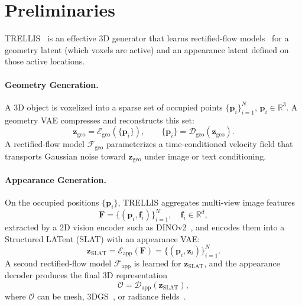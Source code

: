 
\section{Preliminaries}
\label{sec:prelim}

\label{sec:trellis}
TRELLIS~\cite{trellis} is an effective 3D generator that learns rectified-flow models~\cite{lipman2022flow,esser2024scaling} for a geometry latent (which voxels are active) and an appearance latent defined on those active locations.

\paragraph{Geometry Generation.}
A 3D object is voxelized into a sparse set of occupied points $\{\mathbf{p}_i\}_{i=1}^N$, $\mathbf{p}_i \in \mathbb{R}^3$. A geometry VAE compresses and reconstructs this set:
\begin{equation}
    \mathbf{z}_{\text{geo}} = \mathcal{E}_{\text{geo}}(\{\mathbf{p}_i\}), 
    \qquad
    \{\mathbf{p}_i\} = \mathcal{D}_{\text{geo}}(\mathbf{z}_{\text{geo}}).
    \label{eq:trellis-geo}
\end{equation}
A rectified-flow model $\mathcal{F}_{\text{geo}}$ parameterizes a time-conditioned velocity field that transports Gaussian noise toward $\mathbf{z}_{\text{geo}}$ under image or text conditioning.

\paragraph{Appearance Generation.}
On the occupied positions $\{\mathbf{p}_i\}$, TRELLIS aggregates multi-view image features
\[
\mathbf{F} = \{(\mathbf{p}_i, \mathbf{f}_i)\}_{i=1}^N, \quad \mathbf{f}_i \in \mathbb{R}^d,
\]
extracted by a 2D vision encoder such as DINOv2~\cite{dinov2}, and encodes them into a Structured LATent (SLAT) with an appearance VAE:
\begin{equation}
    \mathbf{z}_{\text{SLAT}} = \mathcal{E}_{\text{app}}(\mathbf{F})
    = \{(\mathbf{p}_i, \mathbf{z}_i)\}_{i=1}^N.
    \label{eq:trellis-slat}
\end{equation}
A second rectified-flow model $\mathcal{F}_{\text{app}}$ is learned for $\mathbf{z}_{\text{SLAT}}$, and the appearance decoder produces the final 3D representation
\begin{equation}
    \mathcal{O} = \mathcal{D}_{\text{app}}(\mathbf{z}_{\text{SLAT}}),
\end{equation}
where $\mathcal{O}$ can be mesh, 3DGS~\cite{3dgs}, or radiance fields~\cite{rf}.

